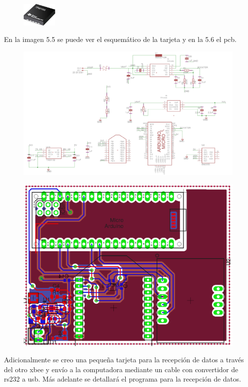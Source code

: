      \begin{figure}[htbp]
     	\centering
     	\includegraphics[width=0.15\textwidth]{./pictures/TPS61093}
     	\caption{}\label{fig: figura}
     \end{figure}
     En la imagen 5.5 se puede ver el esquemático de la tarjeta y en la 5.6 el pcb.
     \begin{figure}[htbp]
     	\centering
     	\includegraphics[width=1.\textwidth]{./pictures/schematic}
     	\caption{}\label{fig: figura}
     \end{figure}
     \begin{figure}[htbp]
     	\centering
     	\includegraphics[width=1.\textwidth]{./pictures/board}
     	\caption{}\label{fig: figura}
     \end{figure}
     Adicionalmente se creo una pequeña tarjeta para la recepción de datos a través del otro xbee y envío a la computadora mediante un cable con convertidor de rs232 a usb. Más adelante se detallará el programa para la recepción de datos.
     
